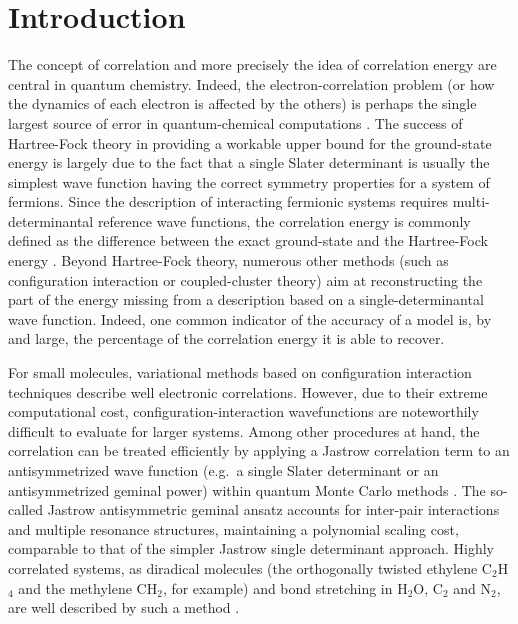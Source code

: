 \documentclass[aps,twocolumn,showpacs,pra,superscriptaddress,floatfix,longbibliography]{revtex4-1}
\newcommand{\7}{\dagger}
\begin{document}

\maketitle


\section{Introduction}
\label{sec:intro}

The concept of correlation and more precisely the idea 
of correlation energy are central in quantum chemistry. 
Indeed, the electron-correlation problem (or how the 
dynamics of each electron is affected by the others) is 
perhaps the single largest source of error in quantum-chemical 
computations \cite{TewKlopperHelgaker}. The success of 
Hartree-Fock theory in providing a workable  
upper bound for the ground-state energy is largely 
due to the fact that a single Slater determinant is 
usually the simplest wave function having the correct 
symmetry properties for a system of fermions. 
Since the description of interacting fermionic systems 
requires multi-determinantal reference wave functions,
the correlation energy is commonly defined as the 
difference between the exact ground-state and the 
Hartree-Fock energy  \cite{WignerCorr,Lowdin}. Beyond 
Hartree-Fock theory, numerous other methods (such as
configuration interaction or coupled-cluster theory) aim
at reconstructing the part of the energy missing from a
description based on a single-determinantal wave function. 
Indeed, one common indicator of the accuracy of a model is, 
by and large, the percentage of the correlation energy it 
is able to recover. 

For small molecules, variational methods based on 
configuration interaction techniques describe well electronic 
correlations. However, due to their extreme computational cost,
configuration-interaction wavefunctions are noteworthily 
difficult to evaluate for larger systems. Among other procedures
at hand, the correlation can be treated efficiently  by applying a 
Jastrow correlation term to an antisymmetrized wave function 
(e.g.~a single Slater determinant or an antisymmetrized geminal 
power) within quantum Monte Carlo methods \cite{CasulaI,CasulaII}.
The so-called Jastrow antisymmetric geminal ansatz accounts 
for inter-pair interactions and multiple resonance structures, 
maintaining a polynomial scaling cost, comparable to that
of the simpler Jastrow single determinant approach. Highly 
correlated systems, as diradical molecules (the orthogonally 
twisted ethylene C$_2$H$_4$ and the methylene CH$_2$,
for example)
and bond stretching in H$_2$O, C$_2$ and N$_2$, 
are well described by such a method \cite{Zen,Neuscamman}. 
\end{document}
